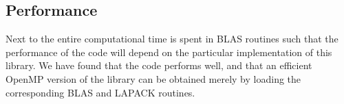 
\subsection{Performance}

Next to the entire computational time is spent in BLAS routines such that the performance of the code will depend on the particular  implementation of this library. 
We have found that the code performs well, and that  an efficient  OpenMP  version of the library  can be obtained merely by   loading the corresponding BLAS and LAPACK routines. 

